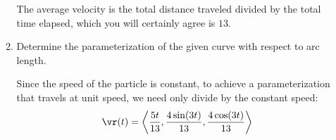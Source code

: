 \begin{enumerate}[leftmargin=0pt]
\begin{enumerate}
    \begin{red}
        The average velocity is the total distance traveled divided by the total time elapsed, which you will certainly agree is $13$.
    \end{red}
    \item Determine the parameterization of the given curve with respect to arc length.

    \begin{red}
        Since the speed of the particle is constant, to achieve a parameterization that travels at unit speed, we need only divide by the constant speed:
        \[\vr(t) = \left\langle
            \frac{5t}{13}, \frac{4\sin(3t)}{13}, \frac{4\cos(3t)}{13}
        \right\rangle \]
    \end{red}
\end{enumerate}

\end{enumerate}
	
